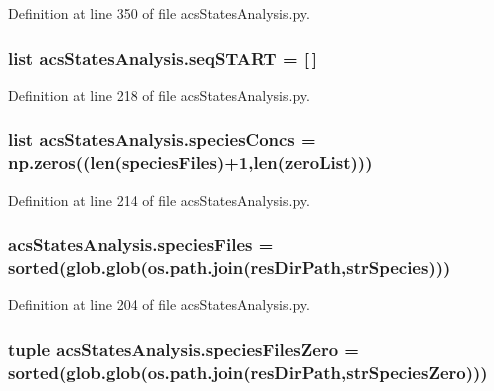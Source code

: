Definition at line 350 of file acs\-States\-Analysis.\-py.

\hypertarget{a00104_a648282264cfc8a40cf84141f9f59781f}{
\subsubsection[{seq\-S\-T\-A\-R\-T}]{\setlength{\rightskip}{0pt plus 5cm}list acs\-States\-Analysis.\-seq\-S\-T\-A\-R\-T = \mbox{[}$\,$\mbox{]}}}\label{a00104_a648282264cfc8a40cf84141f9f59781f}


Definition at line 218 of file acs\-States\-Analysis.\-py.

\hypertarget{a00104_a2377568425051a7511b51f7c50662ba1}{
\subsubsection[{species\-Concs}]{\setlength{\rightskip}{0pt plus 5cm}list acs\-States\-Analysis.\-species\-Concs = np.\-zeros((len({\bf species\-Files})+1,len({\bf zero\-List})))}}\label{a00104_a2377568425051a7511b51f7c50662ba1}


Definition at line 214 of file acs\-States\-Analysis.\-py.

\hypertarget{a00104_af3291bd263282353dd4a12ee38c08cae}{
\subsubsection[{species\-Files}]{\setlength{\rightskip}{0pt plus 5cm}acs\-States\-Analysis.\-species\-Files = sorted(glob.\-glob(os.\-path.\-join({\bf res\-Dir\-Path},{\bf str\-Species})))}}\label{a00104_af3291bd263282353dd4a12ee38c08cae}


Definition at line 204 of file acs\-States\-Analysis.\-py.

\hypertarget{a00104_a5584994da277e7798c904342dff18427}{
\subsubsection[{species\-Files\-Zero}]{\setlength{\rightskip}{0pt plus 5cm}tuple acs\-States\-Analysis.\-species\-Files\-Zero = sorted(glob.\-glob(os.\-path.\-join({\bf res\-Dir\-Path},{\bf str\-Species\-Zero})))}}\label{a00104_a5584994da277e7798c904342dff18427}


